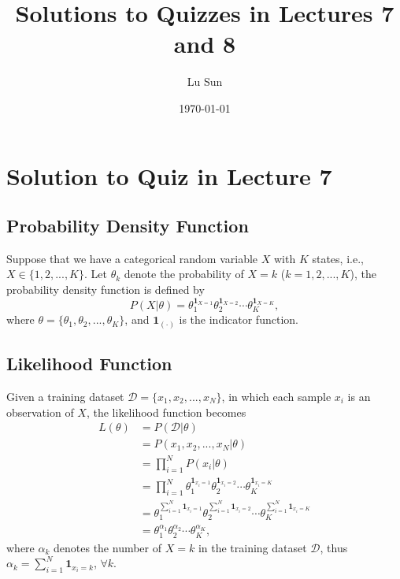 \documentclass[10pt]{article}
\begin{document}
\date{\today}
\title{Solutions to Quizzes in Lectures 7 and 8}
\author{Lu Sun}
\maketitle


\section{Solution to Quiz in Lecture 7}
\subsection{Probability Density Function}
Suppose that we have a categorical random variable $X$
with $K$ states, i.e., $X \in \{ 1,2,...,K\}$.
Let $\theta_k$ denote the probability of $X=k$ ($k = 1,2,...,K$),
the probability density function is defined by
\begin{equation}
	P(X|\theta) = \theta_1^{\mathbf{1}_{X=1}}\theta_2^{\mathbf{1}_{X=2}}\cdots\theta_K^{\mathbf{1}_{X=K}},
	\label{eq_pdf}
\end{equation}
where $\theta = \{ \theta_1,\theta_2,...,\theta_K\}$, and $\mathbf{1}_{(\cdot)}$ is the indicator function.

\subsection{Likelihood Function}
Given a training dataset $\mathcal{D} = \{ x_1,x_2,...,x_N \}$,
in which each sample $x_i$ is an observation of $X$, the likelihood function becomes
\begin{align}
	L(\theta) 
	& = P(\mathcal{D}|\theta) \nonumber \\
	& = P(x_1,x_2,...,x_N | \theta) \nonumber \\
	& = \prod_{i=1}^N P(x_i|\theta) \nonumber \\
	& = \prod_{i=1}^N \theta_1^{\mathbf{1}_{x_i=1}}\theta_2^{\mathbf{1}_{x_i=2}}\cdots\theta_K^{\mathbf{1}_{x_i=K}} \nonumber \\
	& = \theta_1^{\sum_{i=1}^N\mathbf{1}_{x_i=1}} \theta_2^{\sum_{i=1}^N\mathbf{1}_{x_i=2}} \cdots \theta_K^{\sum_{i=1}^N\mathbf{1}_{x_i=K}} \nonumber \\
	& = \theta_1^{\alpha_1} \theta_2^{\alpha_2} \cdots \theta_K^{\alpha_K},
	\label{eq_likelihood}
\end{align}
where $\alpha_k$ denotes the 
number of $X=k$ in the training dataset $\mathcal{D}$, thus $\alpha_k = \sum_{i=1}^N\mathbf{1}_{x_i=k}$, $\forall k$.
\end{document}
